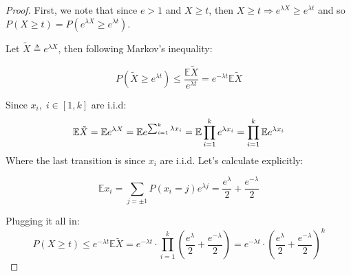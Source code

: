\subsubsection{}
\begin{proof}    
    First, we note that since $e>1$ and $X\geq t$, then $X\geq t \Rightarrow e^{\lambda X} \geq e^{\lambda t}$
    and so $P(X\geq t) = P(e^{\lambda X} \geq e^{\lambda t})$.
    
    Let $\tilde{X} \triangleq e^{\lambda X}$, then following Markov's inequality:
    
    \begin{equation*}
        P(\tilde{X} \geq e^{\lambda t}) \leq \frac{\mathbb{E}\tilde{X}}{e^{\lambda t}} =e^{-\lambda t} \mathbb{E}\tilde{X} 
    \end{equation*}
    
    Since $x_i, \; i\in [1, k]$ are i.i.d:
    \begin{equation*}
        \mathbb{E}\tilde{X} = \mathbb{E} e^{\lambda X} = \mathbb{E} e^{\sum_{i=1}^{k} \lambda x_i} = 
        \mathbb{E} \prod_{i=1}^k e^{\lambda x_i} = \prod_{i=1}^k \mathbb{E} e^{\lambda x_i}
    \end{equation*}
    Where the last transition is since $x_i$ are i.i.d. Let's calculate explicitly:
    
    \begin{equation*}
        \mathbb{E} x_i = \sum_{j=\pm 1} P(x_i=j) e^{\lambda j} = \frac{e^\lambda}{2} + \frac{e^{-\lambda}}{2}
    \end{equation*}
    
    Plugging it all in:
    \begin{equation*}
        P(X\geq t) \leq e^{-\lambda t} \mathbb{E}\tilde{X} = 
        e^{-\lambda t}\cdot \prod_{i=1}^k \left( \frac{e^\lambda}{2} + \frac{e^{-\lambda}}{2} \right)
        = e^{-\lambda t}\cdot \left( \frac{e^\lambda}{2} + \frac{e^{-\lambda}}{2} \right)^k
    \end{equation*}
\end{proof}

